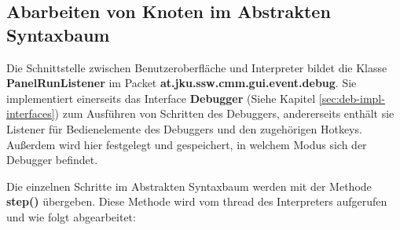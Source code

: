 
\subsection{Abarbeiten von Knoten im Abstrakten Syntaxbaum}
Die Schnittstelle zwischen Benutzeroberfläche und Interpreter bildet die Klasse \textbf{PanelRunListener} im Packet \textbf{at.jku.ssw.cmm.gui.event.debug}. Sie implementiert einerseits das Interface \textbf{Debugger} (Siehe Kapitel \ref{sec:deb-impl-interfaces}) zum Ausführen von Schritten des Debuggers, andererseits enthält sie Listener für Bedienelemente des Debuggers und den zugehörigen Hotkeys. Außerdem wird hier festgelegt und gespeichert, in welchem Modus sich der Debugger befindet.

Die einzelnen Schritte im Abstrakten Syntaxbaum werden mit der Methode \textbf{step()} übergeben. Diese Methode wird vom thread des Interpreters aufgerufen und wie folgt abgearbeitet:

